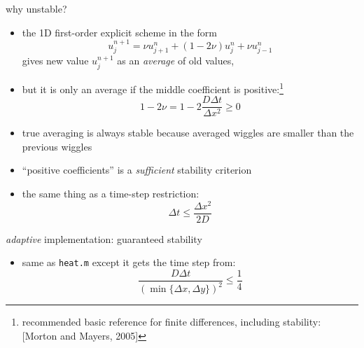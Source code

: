 \begin{frame}{why unstable?}
\label{slide:maxprinc}

\begin{itemize}
\item the 1D first-order explicit scheme in the form 
	$$u_j^{n+1} = \nu u_{j+1}^n + (1 - 2 \nu) u_j^n + \nu u_{j-1}^n$$
gives new value $u_j^{n+1}$ as an \emph{average} of old values,
\item but it is only an average if the middle coefficient is positive:\footnote{recommended basic reference for finite differences, including stability: [Morton and Mayers, 2005]}
	$$1 - 2 \nu = 1 - 2 \frac{D\Delta t}{\Delta x^2} \ge 0$$
\item true averaging is always stable because averaged wiggles are smaller than the previous wiggles
\item ``positive coefficients'' is a \emph{sufficient} stability criterion
\item the same thing as a time-step restriction:
	$$\Delta t \le \frac{\Delta x^2}{2 D}$$
\end{itemize}
\end{frame}


\begin{frame}{\textsl{adaptive} implementation: guaranteed stability}


\small
\begin{itemize}
\item same as \texttt{heat.m} except it gets the time step from:
	$$\frac{D\Delta t}{(\min\{\Delta x,\Delta y\})^2} \le \frac{1}{4}$$
\end{itemize}\end{frame}


